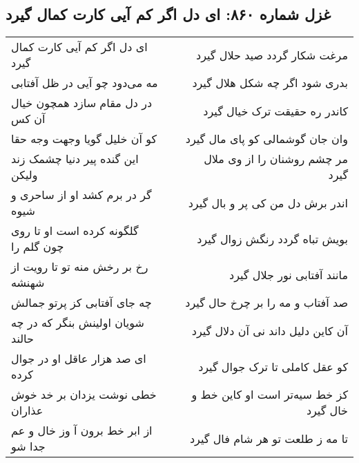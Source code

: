 \begin{center}
\section*{غزل شماره ۸۶۰: ای دل اگر کم آیی کارت کمال گیرد}
\label{sec:0860}
\begin{longtable}{l p{0.5cm} r}
ای دل اگر کم آیی کارت کمال گیرد
&&
مرغت شکار گردد صید حلال گیرد
\\
مه می‌دود چو آیی در ظل آفتابی
&&
بدری شود اگر چه شکل هلال گیرد
\\
در دل مقام سازد همچون خیال آن کس
&&
کاندر ره حقیقت ترک خیال گیرد
\\
کو آن خلیل گویا وجهت وجه حقا
&&
وان جان گوشمالی کو پای مال گیرد
\\
این گنده پیر دنیا چشمک زند ولیکن
&&
مر چشم روشنان را از وی ملال گیرد
\\
گر در برم کشد او از ساحری و شیوه
&&
اندر برش دل من کی پر و بال گیرد
\\
گلگونه کرده است او تا روی چون گلم را
&&
بویش تباه گردد رنگش زوال گیرد
\\
رخ بر رخش منه تو تا رویت از شهنشه
&&
مانند آفتابی نور جلال گیرد
\\
چه جای آفتابی کز پرتو جمالش
&&
صد آفتاب و مه را بر چرخ حال گیرد
\\
شویان اولینش بنگر که در چه حالند
&&
آن کاین دلیل داند نی آن دلال گیرد
\\
ای صد هزار عاقل او در جوال کرده
&&
کو عقل کاملی تا ترک جوال گیرد
\\
خطی نوشت یزدان بر خد خوش عذاران
&&
کز خط سیه‌تر است او کاین خط و خال گیرد
\\
از ابر خط برون آ وز خال و عم جدا شو
&&
تا مه ز طلعت تو هر شام فال گیرد
\\
\end{longtable}
\end{center}
